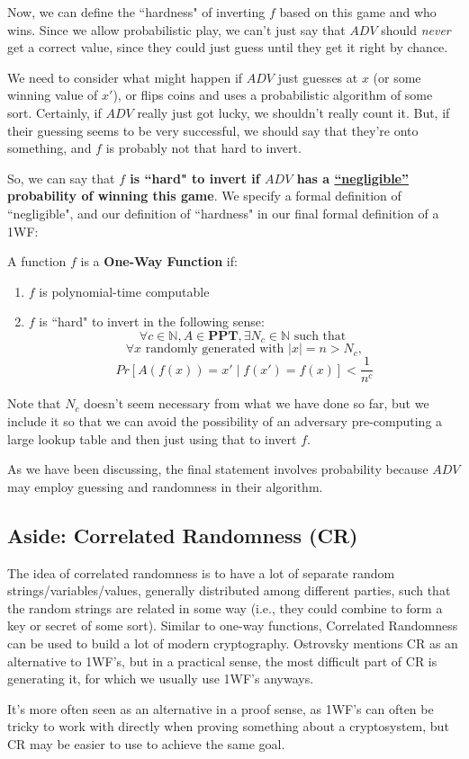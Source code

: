 \documentclass[11pt]{article}
\newcommand{\N}{\mathbb{N}}
\begin{document}
Now, we can define the ``hardness" of inverting \(f\) based on this game and who wins. Since we allow probabilistic play, we can't just say that \(ADV\) should \emph{never} get a correct value, since they could just guess until they get it right by chance.

We need to consider what might happen if \(ADV\) just guesses at \(x\) (or some winning value of \(x'\)), or flips coins and uses a probabilistic algorithm of some sort. Certainly, if \(ADV\) really just got lucky, we shouldn't really count it. But, if their guessing seems to be very successful, we should say that they're onto something, and \(f\) is probably not that hard to invert. 

So, we can say that \textbf{ \(f\) is ``hard" to invert if \(ADV\) has a \underline{``negligible''} probability of winning this game}. We specify a formal definition of ``negligible", and our definition of ``hardness" in our final formal definition of a 1WF:\medskip

A function \(f\) is a \textbf{One-Way Function} if:

\begin{enumerate}
\item \(f\) is polynomial-time computable
\item \(f\) is ``hard" to invert in the following sense:
\[\forall c\in\N, A\in\mathbf{PPT}, \exists N_c\in\N\text{ such that }\]
\[\forall x\text{ randomly generated with }|x|=n>N_c,\]
\[Pr[A(f(x))=x'\mid f(x')=f(x)]<\frac{1}{n^c}\]
\end{enumerate}

Note that \(N_c\) doesn't seem necessary from what we have done so far, but we include it so that we can avoid the possibility of an adversary pre-computing a large lookup table and then just using that to invert \(f\). 

As we have been discussing, the final statement involves probability because \(ADV\) may employ guessing and randomness in their algorithm.


\subsection{Aside: Correlated Randomness (CR)}

The idea of correlated randomness is to have a lot of separate random strings/variables/values, generally distributed among different parties, such that the random strings are related in some way (i.e., they could combine to form a key or secret of some sort). Similar to one-way functions, Correlated Randomness can be used to build a lot of modern cryptography. Ostrovsky mentions CR as an alternative to 1WF's, but in a practical sense, the most difficult part of CR is generating it, for which we usually use 1WF's anyways. \smallskip

It's more often seen as an alternative in a proof sense, as 1WF's can often be tricky to work with directly when proving something about a cryptosystem, but CR may be easier to use to achieve the same goal.
\end{document}
